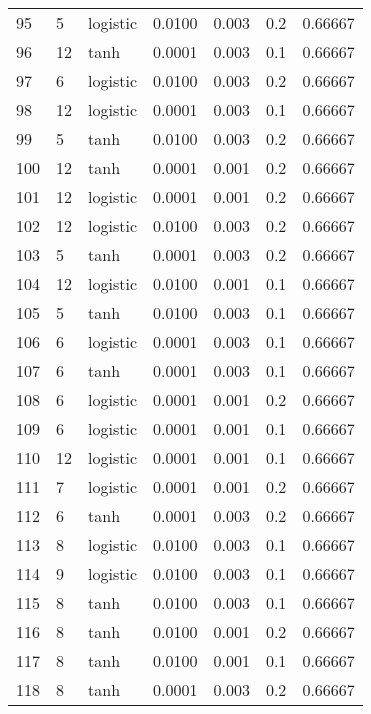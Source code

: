 \begin{tabular}{lllrrrr}
95  &           5 &  logistic &  0.0100 &  0.003 &  0.2 &   0.66667 \\
96  &          12 &      tanh &  0.0001 &  0.003 &  0.1 &   0.66667 \\
97  &           6 &  logistic &  0.0100 &  0.003 &  0.2 &   0.66667 \\
98  &          12 &  logistic &  0.0001 &  0.003 &  0.1 &   0.66667 \\
99  &           5 &      tanh &  0.0100 &  0.003 &  0.2 &   0.66667 \\
100 &          12 &      tanh &  0.0001 &  0.001 &  0.2 &   0.66667 \\
101 &          12 &  logistic &  0.0001 &  0.001 &  0.2 &   0.66667 \\
102 &          12 &  logistic &  0.0100 &  0.003 &  0.2 &   0.66667 \\
103 &           5 &      tanh &  0.0001 &  0.003 &  0.2 &   0.66667 \\
104 &          12 &  logistic &  0.0100 &  0.001 &  0.1 &   0.66667 \\
105 &           5 &      tanh &  0.0100 &  0.003 &  0.1 &   0.66667 \\
106 &           6 &  logistic &  0.0001 &  0.003 &  0.1 &   0.66667 \\
107 &           6 &      tanh &  0.0001 &  0.003 &  0.1 &   0.66667 \\
108 &           6 &  logistic &  0.0001 &  0.001 &  0.2 &   0.66667 \\
109 &           6 &  logistic &  0.0001 &  0.001 &  0.1 &   0.66667 \\
110 &          12 &  logistic &  0.0001 &  0.001 &  0.1 &   0.66667 \\
111 &           7 &  logistic &  0.0001 &  0.001 &  0.2 &   0.66667 \\
112 &           6 &      tanh &  0.0001 &  0.003 &  0.2 &   0.66667 \\
113 &           8 &  logistic &  0.0100 &  0.003 &  0.1 &   0.66667 \\
114 &           9 &  logistic &  0.0100 &  0.003 &  0.1 &   0.66667 \\
115 &           8 &      tanh &  0.0100 &  0.003 &  0.1 &   0.66667 \\
116 &           8 &      tanh &  0.0100 &  0.001 &  0.2 &   0.66667 \\
117 &           8 &      tanh &  0.0100 &  0.001 &  0.1 &   0.66667 \\
118 &           8 &      tanh &  0.0001 &  0.003 &  0.2 &   0.66667 \\

\end{tabular}
